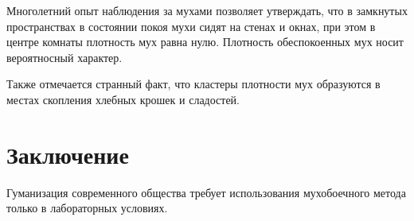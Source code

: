 \documentclass{article} %
\begin{document}
    Многолетний опыт наблюдения за мухами позволяет утверждать, что в замкнутых пространствах в состоянии покоя мухи сидят на стенах и окнах, при этом в центре комнаты плотность мух равна нулю. Плотность обеспокоенных мух носит вероятносный характер.

    Также отмечается странный факт, что кластеры плотности мух образуются в местах скопления хлебных крошек и сладостей.
    
    \section{Заключение}
    Гуманизация современного общества требует использования мухобоечного метода только в лабораторных условиях.
\end{document}
